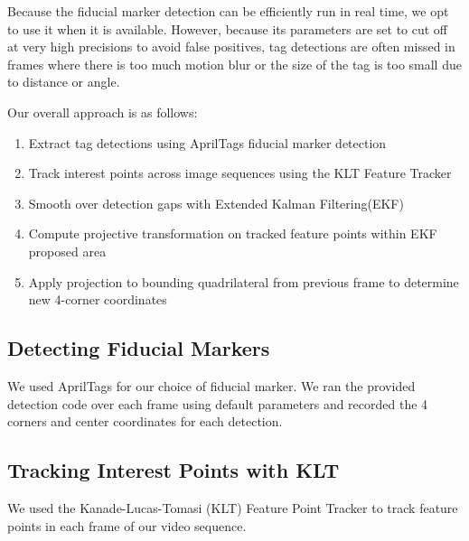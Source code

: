 \documentclass[letterpaper,10pt,conference]{IEEEtran}
\begin{document}
Because the fiducial marker detection can be efficiently run in real time, we opt to use it when it is available. However, because its parameters are set to cut off at very high precisions to avoid false positives, tag detections are often missed in frames where there is too much motion blur or the size of the tag is too small due to distance or angle.

Our overall approach is as follows:
\begin{enumerate}
\item Extract tag detections using AprilTags fiducial marker detection \cite{Olson2011}
\item Track interest points across image sequences using the KLT Feature Tracker \cite{Lucas1981,Shi1994,Tomasi1991}
\item Smooth over detection gaps with Extended Kalman Filtering(EKF) \cite{Thrun2005}
\item Compute projective transformation on tracked feature points within EKF proposed area \cite{Forsyth2002}
\item Apply projection to bounding quadrilateral from previous frame to determine new 4-corner coordinates
\end{enumerate}

\subsection{Detecting Fiducial Markers}
We used AprilTags \cite{Olson2011} for our choice of fiducial marker. We ran the provided detection code over each frame using default parameters and recorded the 4 corners and center coordinates for each detection.

\subsection{Tracking Interest Points with KLT}
We used the Kanade-Lucas-Tomasi (KLT) Feature Point Tracker \cite{Lucas1981,Tomasi1991,Shi1994} to track feature points in each frame of our video sequence.
\end{document}
